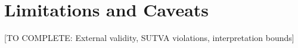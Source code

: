 \section{Limitations and Caveats}

[TO COMPLETE: External validity, SUTVA violations, interpretation bounds]